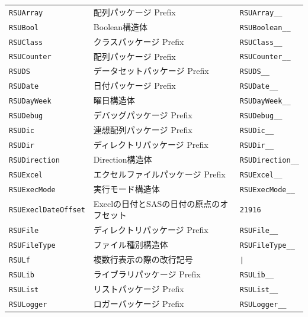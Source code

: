\begin{center}
{\footnotesize
\begin{xltabular}{\textwidth}{|p{5truecm}|X|p{5truecm}|}
\hline
\thead{\DocStrHeaderGlobalConstantName}&\thead{\DocStrDescription}&\thead{\DocStrHeaderGlobalConstantValue}\\
\hline
\hline
\texttt{RSUArray}&配列パッケージ Prefix&\texttt{RSUArray\_\_}\\
\hline
\texttt{RSUBool}&Boolean構造体&\texttt{RSUBoolean\_\_}\\
\hline
\texttt{RSUClass}&クラスパッケージ Prefix&\texttt{RSUClass\_\_}\\
\hline
\texttt{RSUCounter}&配列パッケージ Prefix&\texttt{RSUCounter\_\_}\\
\hline
\texttt{RSUDS}&データセットパッケージ Prefix&\texttt{RSUDS\_\_}\\
\hline
\texttt{RSUDate}&日付パッケージ Prefix&\texttt{RSUDate\_\_}\\
\hline
\texttt{RSUDayWeek}&曜日構造体&\texttt{RSUDayWeek\_\_}\\
\hline
\texttt{RSUDebug}&デバッグパッケージ Prefix&\texttt{RSUDebug\_\_}\\
\hline
\texttt{RSUDic}&連想配列パッケージ Prefix&\texttt{RSUDic\_\_}\\
\hline
\texttt{RSUDir}&ディレクトリパッケージ Prefix&\texttt{RSUDir\_\_}\\
\hline
\texttt{RSUDirection}&Direction構造体&\texttt{RSUDirection\_\_}\\
\hline
\texttt{RSUExcel}&エクセルファイルパッケージ Prefix&\texttt{RSUExcel\_\_}\\
\hline
\texttt{RSUExecMode}&実行モード構造体&\texttt{RSUExecMode\_\_}\\
\hline
\texttt{RSUExeclDateOffset}&Execlの日付とSASの日付の原点のオフセット&\texttt{21916}\\
\hline
\texttt{RSUFile}&ディレクトリパッケージ Prefix&\texttt{RSUFile\_\_}\\
\hline
\texttt{RSUFileType}&ファイル種別構造体&\texttt{RSUFileType\_\_}\\
\hline
\texttt{RSULf}&複数行表示の際の改行記号&\texttt{|}\\
\hline
\texttt{RSULib}&ライブラリパッケージ Prefix&\texttt{RSULib\_\_}\\
\hline
\texttt{RSUList}&リストパッケージ Prefix&\texttt{RSUList\_\_}\\
\hline
\texttt{RSULogger}&ロガーパッケージ Prefix&\texttt{RSULogger\_\_}\\

\end{xltabular}}
\end{center}
